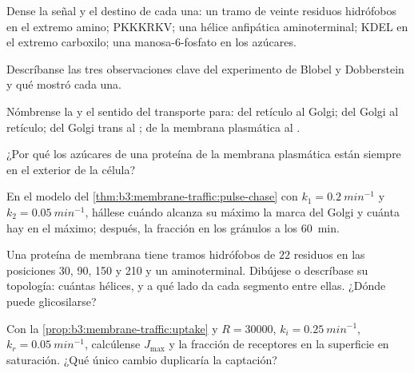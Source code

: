 \begin{exercise}[$\star$]\label{exo:b3:membrane-traffic:1}
Dense la señal y el destino de cada una: un tramo de veinte residuos
hidrófobos en el extremo amino; PKKKRKV; una hélice anfipática
aminoterminal; KDEL en el extremo carboxilo; una manosa-6-fosfato en los
azúcares.
\end{exercise}

\begin{exercise}[$\star$]\label{exo:b3:membrane-traffic:2}
Descríbanse las tres observaciones clave del experimento de
Blobel y Dobberstein y qué mostró cada una.
\end{exercise}

\begin{exercise}[$\star$]\label{exo:b3:membrane-traffic:3}
Nómbrense la  y el sentido del transporte para: del retículo al
Golgi; del Golgi al retículo; del Golgi trans al ; de la membrana
plasmática al .
\end{exercise}

\begin{exercise}[$\star$]\label{exo:b3:membrane-traffic:4}
¿Por qué los azúcares de una proteína de la membrana plasmática están
siempre en el exterior de la célula?
\end{exercise}

\begin{exercise}[$\star\star$]\label{exo:b3:membrane-traffic:5}
En el modelo del \cref{thm:b3:membrane-traffic:pulse-chase} con $k_{1}
= \qty{0.2}{min^{-1}}$ y $k_{2} = \qty{0.05}{min^{-1}}$, hállese cuándo
alcanza su máximo la marca del Golgi y cuánta hay en el máximo; después,
la fracción en los gránulos a los \qty{60}{min}.
\end{exercise}

\begin{exercise}[$\star\star$]\label{exo:b3:membrane-traffic:6}
Una proteína de membrana tiene tramos hidrófobos de $22$ residuos en las
posiciones 30, 90, 150 y 210 y un  aminoterminal. Dibújese o
descríbase su topología: cuántas hélices, y a qué lado da cada segmento
entre ellas. ¿Dónde puede glicosilarse?
\end{exercise}

\begin{exercise}[$\star\star$]\label{exo:b3:membrane-traffic:7}
Con la \cref{prop:b3:membrane-traffic:uptake} y $R = \num{30000}$,
$k_{i} = \qty{0.25}{min^{-1}}$, $k_{r} = \qty{0.05}{min^{-1}}$,
calcúlense $J_{\max}$ y la fracción de receptores en la superficie en
saturación. ¿Qué único cambio duplicaría la captación?
\end{exercise}

